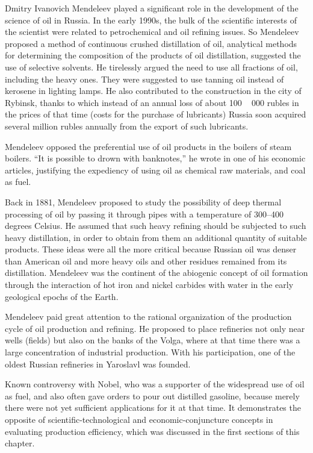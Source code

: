 \documentclass[12pt]{report}
\theoremstyle{definition}
\begin{document}
Dmitry Ivanovich Mendeleev played a significant role in the development of the science of oil in Russia.
In the early 1990s, the bulk of the scientific interests of the scientist were related to petrochemical and oil refining issues.
So Mendeleev proposed a method of continuous crushed distillation of oil, analytical methods for determining the composition of the products of oil distillation, suggested the use of selective solvents.
He tirelessly argued the need to use all fractions of oil, including the heavy ones.
They were suggested to use tanning oil instead of kerosene in lighting lamps.
He also contributed to the construction in the city of Rybinsk, thanks to which instead of an annual loss of about 100 ~ 000 rubles in the prices of that time (costs for the purchase of lubricants) Russia soon acquired several million rubles annually from the export of such lubricants.

Mendeleev opposed the preferential use of oil products in the boilers of steam boilers.
``It is possible to drown with banknotes,'' he wrote in one of his economic articles, justifying the expediency of using oil as chemical raw materials, and coal as fuel.

Back in 1881, Mendeleev proposed to study the possibility of deep thermal processing of oil by passing it through pipes with a temperature of 300--400 degrees Celsius.
He assumed that such heavy refining should be subjected to such heavy distillation, in order to obtain from them an additional quantity of suitable products.
These ideas were all the more critical because Russian oil was denser than American oil and more heavy oils and other residues remained from its distillation.
Mendeleev was the continent of the abiogenic concept of oil formation through the interaction of hot iron and nickel carbides with water in the early geological epochs of the Earth.

Mendeleev paid great attention to the rational organization of the production cycle of oil production and refining.
He proposed to place refineries not only near wells (fields) but also on the banks of the Volga, where at that time there was a large concentration of industrial production.
With his participation, one of the oldest Russian refineries in Yaroslavl was founded.

Known controversy with Nobel, who was a supporter of the widespread use of oil as fuel, and also often gave orders to pour out distilled gasoline, because merely
there were not yet sufficient applications for it at that time. It demonstrates the opposite of scientific-technological and economic-conjuncture concepts in evaluating production efficiency, which was discussed in the first sections of this chapter.
\end{document}
